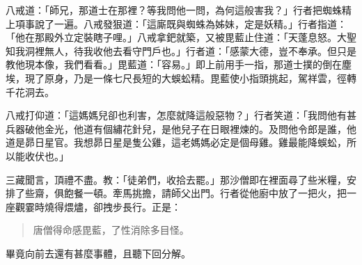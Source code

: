 八戒道：「師兄，那道士在那裡？等我問他一問，為何這般害我？」行者把蜘蛛精上項事說了一遍。八戒發狠道：「這廝既與蜘蛛為姊妹，定是妖精。」行者指道：「他在那殿外立定裝瞎子哩。」八戒拿鈀就築，又被毘藍止住道：「天蓬息怒。大聖知我洞裡無人，待我收他去看守門戶也。」行者道：「感蒙大德，豈不奉承。但只是教他現本像，我們看看。」毘藍道：「容易。」即上前用手一指，那道士撲的倒在塵埃，現了原身，乃是一條七尺長短的大蜈蚣精。毘藍使小指頭挑起，駕祥雲，徑轉千花洞去。

八戒打仰道：「這媽媽兒卻也利害，怎麼就降這般惡物？」行者笑道：「我問他有甚兵器破他金光，他道有個繡花針兒，是他兒子在日眼裡煉的。及問他令郎是誰，他道是昴日星官。我想昴日星是隻公雞，這老媽媽必定是個母雞。雞最能降蜈蚣，所以能收伏也。」

三藏聞言，頂禮不盡。教：「徒弟們，收拾去罷。」那沙僧即在裡面尋了些米糧，安排了些齋，俱飽餐一頓。牽馬挑擔，請師父出門。行者從他廚中放了一把火，把一座觀霎時燒得煨燼，卻拽步長行。正是：
\begin{quote}
唐僧得命感毘藍，了性消除多目怪。
\end{quote}

畢竟向前去還有甚麼事體，且聽下回分解。
